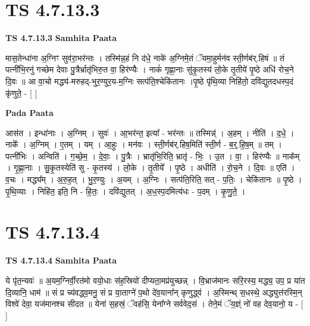 \documentclass[17pt]{extarticle}
\begin{document}

\section{ TS 4.7.13.3 }

\textbf{TS 4.7.13.3 } \newline
\textbf{Samhita Paata} \newline

मास॒तेन्धा॑ना अ॒ग्निꣳ सुव॑रा॒भर॑न्तः । तस्मि॑न्न॒हं नि द॑धे॒ नाके॑ अ॒ग्निमे॒तं ॅयमा॒हुर्मन॑व स्ती॒र्णब॑र्.हिषं ॥ तं पत्नी॑भि॒रनु॑ गच्छेम देवाः पु॒त्रैर्भ्रातृ॑भिरु॒त वा॒ हिर॑ण्यैः । नाकं॑ गृह्णा॒नाः सु॑कृ॒तस्य॑ लो॒के तृ॒तीये॑ पृ॒ष्ठे अधि॑ रोच॒ने दि॒वः ॥ आ वा॒चो मद्ध्य॑-मरुहद्-भुर॒ण्युर॒य-म॒ग्निः सत्प॑ति॒श्चेकि॑तानः ।पृ॒ष्ठे पृ॑थि॒व्या निहि॑तो॒ दवि॑द्युतदधस्प॒दं कृ॑णुते॒ - [  ] \newline

\textbf{Pada Paata} \newline

आस॑त । इन्धा॑नाः । अ॒ग्निम् । सुवः॑ । आ॒भर॑न्त॒ इत्या᳚ - भर॑न्तः ॥ तस्मिन्न्॑ । अ॒हम् । नीति॑ । द॒धे॒ । नाके᳚ । अ॒ग्निम् । ए॒तम् । यम् । आ॒हुः । मन॑वः । स्ती॒र्णब॑र्.हिष॒मिति॑ स्ती॒र्ण - ब॒र्॒.हि॒ष॒म् ॥ तम् । पत्नी॑भिः । अन्विति॑ । ग॒च्छे॒म॒ । दे॒वाः॒ । पु॒त्रैः । भ्रातृ॑भि॒रिति॒ भ्रातृ॑ - भिः॒ । उ॒त । वा॒ । हिर॑ण्यैः ॥ नाक᳚म् । गृ॒ह्णा॒नाः । सु॒कृ॒तस्येति॑ सु - कृ॒तस्य॑ । लो॒के । तृ॒तीये᳚ । पृ॒ष्ठे । अधीति॑ । रो॒च॒ने । दि॒वः ॥ एति॑ । व॒चः । मद्ध्य᳚म् । अ॒रु॒ह॒त् । भु॒र॒ण्युः । अ॒यम् । अ॒ग्निः । सत्प॑ति॒रिति॒ सत् - प॒तिः॒ । चेकि॑तानः ॥ पृ॒ष्ठे । पृ॒थि॒व्याः । निहि॑त॒ इति॒ नि - हि॒तः॒ । दवि॑द्युतत् । अ॒ध॒स्प॒दमित्य॑धः - प॒दम् । कृ॒णु॒ते॒ ।  \newline





\section{ TS 4.7.13.4 }

\textbf{TS 4.7.13.4 } \newline
\textbf{Samhita Paata} \newline

ये पृ॑त॒न्यवः॑ ॥ अ॒यम॒ग्निर्वी॒रत॑मो वयो॒धाः स॑ह॒स्रियो॑ दीप्यता॒मप्र॑युच्छन्न् । वि॒भ्राज॑मानः सरि॒रस्य॒ मद्ध्य॒ उप॒ प्र या॑त दि॒व्यानि॒ धाम॑ ॥ सं प्र च्य॑वद्ध्व॒मनु॒ सं प्र या॒ताग्ने॑ प॒थो दे॑व॒याना᳚न् कृणुद्ध्वं । अ॒स्मिन्थ् स॒धस्थे॒ अद्ध्युत्त॑रस्मि॒न् विश्वे॑ देवा॒ यज॑मानश्च सीदत ॥ येना॑ स॒हस्रं॒ ॅवह॑सि॒ येना᳚ग्ने सर्ववेद॒सं । तेने॒मं ॅय॒ज्ञ्ं नो॑ वह देव॒यानो॒ य - [  ] \newline
\end{document}
